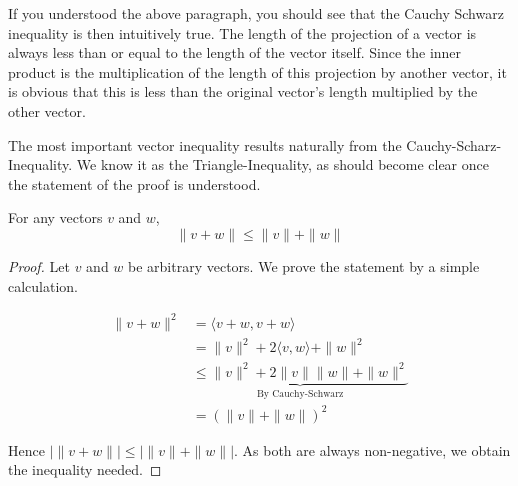 \begin{center}
\end{center}

If you understood the above paragraph, you should see that the Cauchy Schwarz inequality is then intuitively true. The length of the projection of a vector is always less than or equal to the length of the vector itself. Since the inner product is the multiplication of the length of this projection by another vector, it is obvious that this is less than the original vector's length multiplied by the other vector.

The most important vector inequality results naturally from the Cauchy-Scharz-Inequality. We know it as the Triangle-Inequality, as should become clear once the statement of the proof is understood.

\begin{theorem}
  For any vectors $v$ and $w$,
  \[ \| v + w \| \leq \| v \| + \| w \| \]
\end{theorem}

\begin{proof}
  Let $v$ and $w$ be arbitrary vectors. We prove the statement by a simple calculation.

  \begin{align*}
    \| v + w \|^2 &= \langle v + w, v + w \rangle\\
                  &= \|v\|^2 + 2\langle v,w \rangle + \|w\|^2\\
                  &\underbrace{\leq \|v\|^2 + 2\|v\|\|w\| + \|w\|^2}_\text{By Cauchy-Schwarz}\\
                  &= (\|v\| + \|w\|)^2
  \end{align*}

  Hence $| \| v + w \| | \leq |\|v\| + \|w\| |$. As both are always non-negative, we obtain the inequality needed.
\end{proof}

\begin{center}
\end{center}

